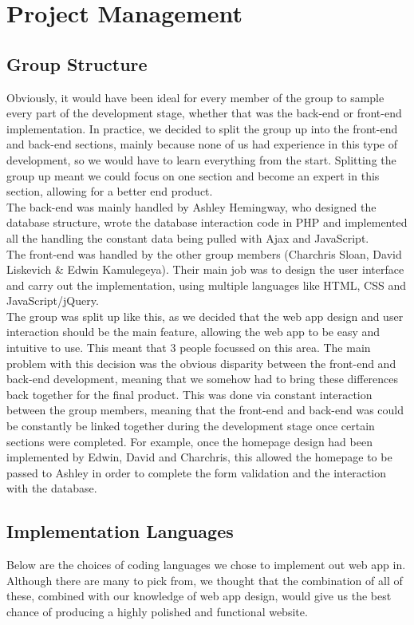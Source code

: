 \documentclass{article}
\begin{document}
\section{Project Management}
\subsection{Group Structure}
Obviously, it would have been ideal for every member of the group to sample every part of the development stage, whether that was the back-end or front-end implementation. In practice, we decided to split the group up into the front-end and back-end sections, mainly because none of us had experience in this type of development, so we would have to learn everything from the start. Splitting the group up meant we could focus on one section and become an expert in this section, allowing for a better end product.\\
The back-end was mainly handled by Ashley Hemingway, who designed the database structure, wrote the database interaction code in PHP and implemented all the handling the constant data being pulled with Ajax and JavaScript.\\
The front-end was handled by the other group members (Charchris Sloan, David Liskevich \& Edwin Kamulegeya). Their main job was to design the user interface and carry out the implementation, using multiple languages like HTML, CSS and JavaScript/jQuery.\\
The group was split up like this, as we decided that the web app design and user interaction should be the main feature, allowing the web app to be easy and intuitive to use. This meant that 3 people focussed on this area. The main problem with this decision was the obvious disparity between the front-end and back-end development, meaning that we somehow had to bring these differences back together for the final product. This was done via constant interaction between the group members, meaning that the front-end and back-end was could be constantly be linked together during the development stage once certain sections were completed. For example, once the homepage design had been implemented by Edwin, David and Charchris, this allowed the homepage to be passed to Ashley in order to complete the form validation and the interaction with the database.
\subsection{Implementation Languages}
Below are the choices of coding languages we chose to implement out web app in. Although there are many to pick from, we thought that the combination of all of these, combined with our knowledge of web app design, would give us the best chance of producing a highly polished and functional website.
\end{document}
